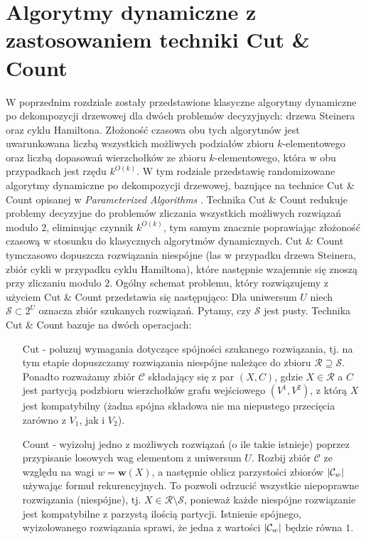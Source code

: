 \documentclass[12pt, oneside]{report}
\newcommand\Omicron{O}
\begin{document}
\newpage
  	\chapter{Algorytmy dynamiczne z zastosowaniem techniki Cut \& Count}
  	\label{cut_n_count}

W poprzednim rozdziale zostały przedstawione klasyczne algorytmy dynamiczne po dekompozycji drzewowej dla dwóch problemów decyzyjnych: drzewa Steinera oraz cyklu Hamiltona. Złożoność czasowa obu tych algorytmów jest uwarunkowana liczbą wszystkich możliwych podziałów zbioru $k$-elementowego oraz liczbą dopasowań wierzchołków ze zbioru $k$-elementowego, która w obu przypadkach jest rzędu $k^{\Omicron{(k)}}$.
W tym rodziale przedstawię randomizowane algorytmy dynamiczne po dekompozycji drzewowej, bazujące na technice Cut \& Count opisanej w \emph{Parameterized Algorithms} \cite{parametrized_algorithms}. Technika Cut \& Count redukuje problemy decyzyjne do problemów zliczania wszystkich możliwych rozwiązań modulo $2$, eliminując czynnik $k^{\Omicron{(k)}}$, tym samym znacznie poprawiając złożoność czasową w stosunku do klasycznych algorytmów dynamicznych. Cut \& Count tymczasowo dopuszcza rozwiązania niespójne (las w przypadku drzewa Steinera, zbiór cykli w przypadku cyklu Hamiltona), które następnie wzajemnie się znoszą przy zliczaniu modulo $2$.\newline\newline
Ogólny schemat problemu, który rozwiązujemy z użyciem Cut \& Count przedstawia się następująco: 
Dla uniwersum $U$ niech $\mathcal{S} \subset 2^U$ oznacza zbiór szukanych rozwiązań. Pytamy, czy $\mathcal{S}$ jest pusty.\newline\newline
Technika Cut \& Count bazuje na dwóch operacjach:

\begin{enumerate}

\item[Cut] - poluzuj wymagania dotyczące spójności szukanego rozwiązania, tj. na tym etapie dopuszczamy rozwiązania niespójne należące do zbioru $\mathcal{R} \supseteq \mathcal{S}$. Ponadto rozważamy zbiór $\mathcal{C}$ składający się z par $(X, C)$, gdzie $X \in \mathcal{R}$ a $C$ jest partycją podzbioru wierzchołków grafu wejściowego $(V^1, V^2)$, z którą $X$ jest kompatybilny (żadna spójna składowa nie ma niepustego przecięcia zarówno z $V_1$, jak i $V_2$).  

\item[Count] - wyizoluj jedno z możliwych rozwiązań (o ile takie istnieje) poprzez przypisanie losowych wag elementom z uniwersum $U$. Rozbij zbiór $\mathcal{C}$ ze względu na wagi $w = \mathbf{w}(X)$, a następnie oblicz parzystości zbiorów $\abs{\mathcal{C}_w}$ używając formuł rekurencyjnych. To pozwoli odrzucić wszystkie niepoprawne rozwiązania (niespójne), tj. $X \in \mathcal{R} \setminus \mathcal{S}$, ponieważ każde niespójne rozwiązanie jest kompatybilne z parzystą ilością partycji. Istnienie spójnego, wyizolowanego rozwiązania sprawi, że jedna z wartości $\abs{\mathcal{C}_w}$ będzie równa $1$.

\end{enumerate}
\end{document}
